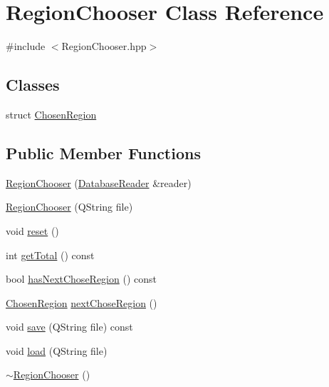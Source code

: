 \hypertarget{class_region_chooser}{\section{Region\+Chooser Class Reference}
\label{class_region_chooser}
}


{\ttfamily \#include $<$Region\+Chooser.\+hpp$>$}

\subsection*{Classes}
\begin{DoxyCompactItemize}
\item 
struct \hyperlink{struct_region_chooser_1_1_chosen_region}{Chosen\+Region}
\end{DoxyCompactItemize}
\subsection*{Public Member Functions}
\begin{DoxyCompactItemize}
\item 
\hyperlink{class_region_chooser_a297d64a95b02e5c556aa68ce4f38f55f}{Region\+Chooser} (\hyperlink{class_database_reader}{Database\+Reader} \&reader)
\item 
\hyperlink{class_region_chooser_a64da90912e5e3e4beb0491ea810d4d9a}{Region\+Chooser} (Q\+String file)
\item 
void \hyperlink{class_region_chooser_a9afaf9f750216aab6f5d211fe5b1953e}{reset} ()
\item 
int \hyperlink{class_region_chooser_a315b5e70d4861a81ce73077b99471132}{get\+Total} () const 
\item 
bool \hyperlink{class_region_chooser_a6bc2e40d1d220a95174595d8945fb1ba}{has\+Next\+Chose\+Region} () const 
\item 
\hyperlink{struct_region_chooser_1_1_chosen_region}{Chosen\+Region} \hyperlink{class_region_chooser_af20ff7542188a82b04a64c687038743f}{next\+Chose\+Region} ()
\item 
void \hyperlink{class_region_chooser_a8c4f46952101f71bb6b549f79e6eb3c1}{save} (Q\+String file) const 
\item 
void \hyperlink{class_region_chooser_a216b76f2ffe79ec787c971445c9db818}{load} (Q\+String file)
\item 
\hyperlink{class_region_chooser_aff58f03e7f0009a5b6ffd9b64f16b52f}{$\sim$\+Region\+Chooser} ()
\end{DoxyCompactItemize}
